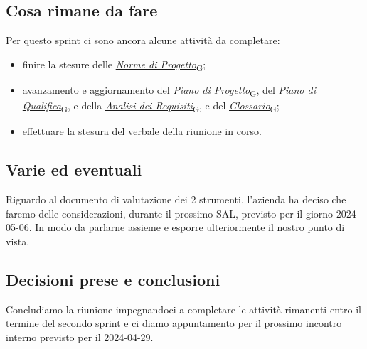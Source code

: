 \documentclass[italian,12pt]{article}
\begin{document}
\subsection{Cosa rimane da fare}
Per questo sprint ci sono ancora alcune attività da completare:
\begin{itemize}
	\item finire la stesure delle \href{https://7last.github.io/docs/rtb/documentazione-interna/glossario#norme-di-progetto}{\textit{Norme di Progetto}\textsubscript{G}};
	\item avanzamento e aggiornamento del \href{https://7last.github.io/docs/rtb/documentazione-interna/glossario#piano-di-progetto}{\textit{Piano di Progetto}\textsubscript{G}}, del \href{https://7last.github.io/docs/rtb/documentazione-interna/glossario#piano-di-qualifica}{\textit{Piano di Qualifica}\textsubscript{G}}, e della \href{https://7last.github.io/docs/rtb/documentazione-interna/glossario#analisi-dei-requisiti}{\textit{Analisi dei Requisiti}\textsubscript{G}}, e del \href{https://7last.github.io/docs/rtb/documentazione-interna/glossario#glossario}{\textit{Glossario}\textsubscript{G}};
	\item effettuare la stesura del verbale della riunione in corso.
\end{itemize}

\subsection{Varie ed eventuali}
Riguardo al documento di valutazione dei 2 strumenti, l'azienda ha deciso che faremo delle considerazioni, durante il prossimo SAL, previsto per il giorno 2024-05-06. In modo da parlarne assieme e esporre ulteriormente il nostro punto di vista.

\subsection{Decisioni prese e conclusioni}
Concludiamo la riunione impegnandoci a completare le attività rimanenti entro il termine del secondo sprint e ci diamo appuntamento per il prossimo incontro interno previsto per il 2024-04-29.
\end{document}
